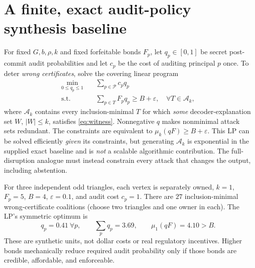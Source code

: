 \documentclass[10pt,a4paper]{article}
\newcommand{\Pc}{\mathcal P}
\begin{document}
\section{A finite, exact audit-policy synthesis baseline}
For fixed $G,b,\rho,k$ and fixed forfeitable bonds $F_p$, let $q_p\in[0,1]$ be secret post-commit audit probabilities and let $c_p$ be the cost of auditing principal $p$ once. To deter \emph{wrong certificates}, solve the covering linear program
\begin{align}\label{eq:LP}
 \min_{0\le q_p\le1}\quad &\sum_{p\in\Pc}c_pq_p\\
 \mathrm{s.t.}\quad &\sum_{p\in T}F_pq_p\ge B+\varepsilon,\quad\forall T\in\mathcal A_k,\nonumber
\end{align}
where $\mathcal A_k$ contains every inclusion-minimal $T$ for which \emph{some} decoder-explanation set $W$, $|W|\le k$, satisfies \eqref{eq:witness}. Nonnegative $q$ makes nonminimal attack sets redundant. The constraints are equivalent to $\mu_k(qF)\ge B+\varepsilon$. This LP can be solved efficiently \emph{given} its constraints, but generating $\mathcal A_k$ is exponential in the supplied exact baseline and is \emph{not} a scalable algorithmic contribution. The full-disruption analogue must instead constrain every attack that changes the output, including abstention.\par
For three independent odd triangles, each vertex is separately owned, $k=1$, $F_p=5$, $B=4$, $\varepsilon=0.1$, and audit cost $c_p=1$. There are $27$ inclusion-minimal wrong-certificate coalitions (choose two triangles and one owner in each). The LP's symmetric optimum is
\[q_p=0.41\ \forall p,\qquad \sum_pq_p=3.69,\qquad \mu_1(qF)=4.10>B.\]
These are synthetic units, not dollar costs or real regulatory incentives. Higher bonds mechanically reduce required audit probability only if those bonds are credible, affordable, and enforceable.
\end{document}
